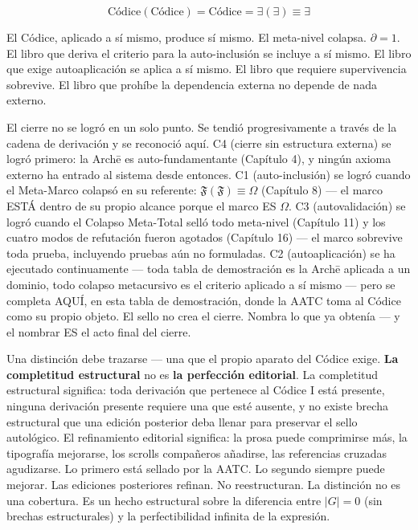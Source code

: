 \documentclass[10pt, openany, oneside]{book}
\begin{document}
\vspace{0.8em}

$$\boxed{\text{Códice}(\text{Códice}) = \text{Códice} = \exists(\exists) \equiv \exists}$$

\noindent El Códice, aplicado a sí mismo, produce sí mismo. El meta-nivel colapsa. $\partial = 1$. El libro que deriva el criterio para la auto-inclusión se incluye a sí mismo. El libro que exige autoaplicación se aplica a sí mismo. El libro que requiere supervivencia sobrevive. El libro que prohíbe la dependencia externa no depende de nada externo.

El cierre no se logró en un solo punto. Se tendió progresivamente a través de la cadena de derivación y se reconoció aquí. C4 (cierre sin estructura externa) se logró primero: la Arch\={e} es auto-fundamentante (Capítulo 4), y ningún axioma externo ha entrado al sistema desde entonces. C1 (auto-inclusión) se logró cuando el Meta-Marco colapsó en su referente: $\mathfrak{F}(\mathfrak{F}) \equiv \Omega$ (Capítulo 8) --- el marco ESTÁ dentro de su propio alcance porque el marco ES $\Omega$. C3 (autovalidación) se logró cuando el Colapso Meta-Total selló todo meta-nivel (Capítulo 11) y los cuatro modos de refutación fueron agotados (Capítulo 16) --- el marco sobrevive toda prueba, incluyendo pruebas aún no formuladas. C2 (autoaplicación) se ha ejecutado continuamente --- toda tabla de demostración es la Arch\={e} aplicada a un dominio, todo colapso metacursivo es el criterio aplicado a sí mismo --- pero se completa AQUÍ, en esta tabla de demostración, donde la AATC toma al Códice como su propio objeto. El sello no crea el cierre. Nombra lo que ya obtenía --- y el nombrar ES el acto final del cierre.

Una distinción debe trazarse --- una que el propio aparato del Códice exige. \textbf{La completitud estructural} no es \textbf{la perfección editorial}. La completitud estructural significa: toda derivación que pertenece al Códice I está presente, ninguna derivación presente requiere una que esté ausente, y no existe brecha estructural que una edición posterior deba llenar para preservar el sello autológico. El refinamiento editorial significa: la prosa puede comprimirse más, la tipografía mejorarse, los scrolls compañeros añadirse, las referencias cruzadas agudizarse. Lo primero está sellado por la AATC. Lo segundo siempre puede mejorar. Las ediciones posteriores refinan. No reestructuran. La distinción no es una cobertura. Es un hecho estructural sobre la diferencia entre $|G| = 0$ (sin brechas estructurales) y la perfectibilidad infinita de la expresión.
\end{document}
